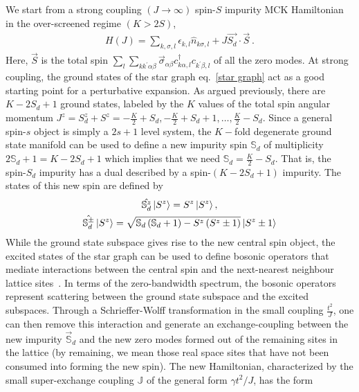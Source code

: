 \documentclass[reprint,prb,superscriptaddress]{revtex4-2}
\begin{document}
We start from a strong coupling \((J \to \infty)\) spin-\(S\) impurity MCK Hamiltonian in the over-screened regime \(\left( K > 2S \right) \),
\begin{equation}\begin{aligned}
	\label{strong_ham}
	H(J) = \sum_{k,\sigma,l}\epsilon_{k,l} \hat n_{k\sigma,l} + J \vec{S_d}\cdot\vec{S}~.
\end{aligned}\end{equation}
Here, \(\vec S\) is the total spin \(\sum_l \sum_{kk^\prime \alpha\beta} \vec \sigma_{\alpha\beta}c^\dagger_{k\alpha,l}c_{k^\prime\beta,l}\) of all the zero modes. At strong coupling, the ground states of the star graph eq.~\ref{star graph} act as a good starting point for a perturbative expansion. As argued previously, there are \(K-2S_d+1\) ground states, labeled by the \(K\) values of the total spin angular momentum \(J^z = S_d^z + S^z = -\frac{K}{2} + S_d, -\frac{K}{2} + S_d + 1, \ldots, \frac{K}{2} - S_d\). Since a general spin-\(s\) object is simply a \(2s+1\) level system, the \(K-\)fold degenerate ground state manifold can be used to define a new impurity spin \(\mathbb{S}_d\) of multiplicity \(2\mathbb{S}_d + 1 = K-2S_d+1\) which implies that we need \(\mathbb{S}_d = \frac{K}{2} - S_d\). That is, the spin-\(S_d\) impurity has a dual described by a spin-\((K-2S_d+1)\) impurity. The states of this new spin are defined by
\begin{gather}
	\hat{\mathbb{S}_d^z} \ket{S^z} = S^z \ket{S^z},\nonumber\\
	\hat{\mathbb{S}_d^\pm} \ket{S^z} = \sqrt{\mathbb{S}_d\left( \mathbb{S}_d + 1 \right) - S^z\left( S^z \pm 1\right)} \ket{S^z \pm 1}
\end{gather}
While the ground state subspace gives rise to the new central spin object, the excited states of the star graph can be used to define bosonic operators that mediate interactions between the central spin and the next-nearest neighbour lattice sites~\cite{kroha_kolf_2007}. In terms of the zero-bandwidth spectrum, the bosonic operators represent scattering between the ground state subspace and the excited subspaces. Through a Schrieffer-Wolff transformation in the small coupling \(\frac{t^2}{J}\), one can then remove this interaction and generate an exchange-coupling between the new impurity \(\vec {\mathbb{S}}_d\) and the new zero modes formed out of the remaining sites in the lattice \cite{kroha_kolf_2007} (by remaining, we mean those real space sites that have not been consumed into forming the new spin). The new Hamiltonian, characterized by the small super-exchange  coupling \(\mathbb{J}\) of the general form \(\gamma t^2/J\), has the form
\end{document}
